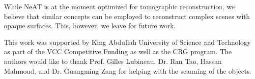 \documentclass[acmtog,nonacm]{acmart} \acmSubmissionID{0438}
\newcommand{\neat}{NeAT\xspace}
\begin{document}
While \neat is at the moment optimized for tomographic reconstruction,
we believe that similar concepts can be employed to reconstruct
complex scenes with opaque surfaces. This, however, we leave for
future work.

 

\begin{acks}


This work was supported by King Abdullah University of Science and
Technology as part of the VCC Competitive Funding as well as the CRG
program. The authors would like to thank Prof. Gilles Lubineau,
Dr. Ran Tao, Hassan Mahmoud, and Dr. Guangming Zang for helping with
the scanning of the objects.  
 

\end{acks}



\end{document}
